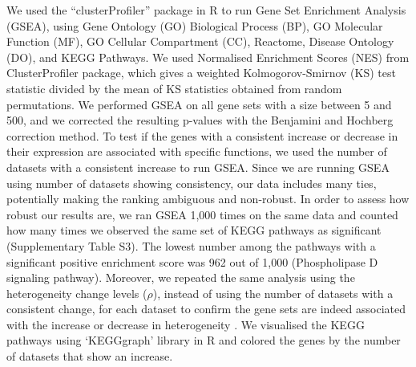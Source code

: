 \documentclass[12pt,twoside]{unicam}
\begin{document}
We used the ``clusterProfiler'' package in R to run Gene Set Enrichment Analysis (GSEA), using Gene Ontology (GO) Biological Process (BP), GO Molecular Function (MF), GO Cellular Compartment (CC), Reactome, Disease Ontology (DO), and KEGG Pathways. We used Normalised Enrichment Scores (NES) from ClusterProfiler package, which gives a weighted Kolmogorov-Smirnov (KS) test statistic divided by the mean of KS statistics obtained from random permutations. We performed GSEA on all gene sets with a size between 5 and 500, and we corrected the resulting p-values with the Benjamini and Hochberg correction method. To test if the genes with a consistent increase or decrease in their expression are associated with specific functions, we used the number of datasets with a consistent increase to run GSEA. Since we are running GSEA using number of datasets showing consistency, our data includes many ties, potentially making the ranking ambiguous and non-robust. In order to assess how robust our results are, we ran GSEA 1,000 times on the same data and counted how many times we observed the same set of KEGG pathways as significant (Supplementary Table S3). The lowest number among the pathways with a significant positive enrichment score was 962 out of 1,000 (Phospholipase D signaling pathway). Moreover, we repeated the same analysis using the heterogeneity change levels (\(\rho\)), instead of using the number of datasets with a consistent change, for each dataset to confirm the gene sets are indeed associated with the increase or decrease in heterogeneity
. We visualised the KEGG pathways using `KEGGgraph' library in R and colored the genes by the number of datasets that show an increase.
\end{document}
